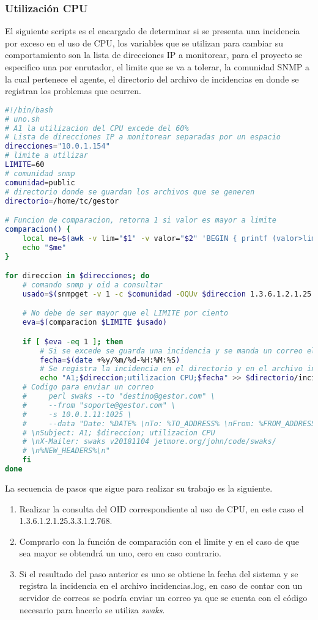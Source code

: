 \documentclass[a4paper,12pt]{article}
\begin{document}
\subsubsection{Utilización CPU}
El siguiente scripts es el encargado de determinar si se presenta una incidencia por exceso en el uso de CPU, los variables que se utilizan para cambiar su comportamiento son la lista de direcciones IP a monitorear, para el proyecto se especifico una por enrutador, el limite que se va a tolerar, la comunidad SNMP a la cual pertenece el agente, el directorio del archivo de incidencias en donde se registran los problemas que ocurren.
\begin{lstlisting}[language=bash]
 #!/bin/bash
# uno.sh
# A1 la utilizacion del CPU excede del 60%
# Lista de direcciones IP a monitorear separadas por un espacio
direcciones="10.0.1.154"
# limite a utilizar
LIMITE=60
# comunidad snmp
comunidad=public
# directorio donde se guardan los archivos que se generen
directorio=/home/tc/gestor

# Funcion de comparacion, retorna 1 si valor es mayor a limite
comparacion() {
    local me=$(awk -v lim="$1" -v valor="$2" 'BEGIN { printf (valor>lim?1:0) }')
    echo "$me"
}

for direccion in $direcciones; do
    # comando snmp y oid a consultar
    usado=$(snmpget -v 1 -c $comunidad -OQUv $direccion 1.3.6.1.2.1.25.3.3.1.2.768)

    # No debe de ser mayor que el LIMITE por ciento
    eva=$(comparacion $LIMITE $usado)

    if [ $eva -eq 1 ]; then
        # Si se excede se guarda una incidencia y se manda un correo electronico
        fecha=$(date +%y/%m/%d-%H:%M:%S)
        # Se registra la incidencia en el directorio y en el archivo incidencias
        echo "A1;$direccion;utilizacion CPU;$fecha" >> $directorio/incidencias.log
    # Codigo para enviar un correo
    #     perl swaks --to "destino@gestor.com" \
    #     --from "soporte@gestor.com" \
    #     -s 10.0.1.11:1025 \
    #     --data "Date: %DATE% \nTo: %TO_ADDRESS% \nFrom: %FROM_ADDRESS% 
    # \nSubject: A1; $direccion; utilizacion CPU 
    # \nX-Mailer: swaks v20181104 jetmore.org/john/code/swaks/
    # \n%NEW_HEADERS%\n"
    fi
done
\end{lstlisting}
La secuencia de pasos que sigue para realizar su trabajo es la siguiente.
\begin{enumerate}
 \item Realizar la consulta del OID correspondiente al uso de CPU, en este caso el 1.3.6.1.2.1.25.3.3.1.2.768.
 \item Comprarlo con la función de comparación con el limite y en el caso de que sea mayor se obtendrá un uno, cero en caso contrario.
 \item Si el resultado del paso anterior es uno se obtiene la fecha del sistema y se registra la incidencia en el archivo incidencias.log, en caso de contar con un servidor de correos se podría enviar un correo ya que se cuenta con el código necesario para hacerlo se utiliza \emph{swaks}.
\end{enumerate}
\end{document}
